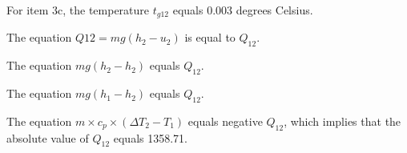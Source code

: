 For item 3c, the temperature \( t_{g12} \) equals 0.003 degrees Celsius.

The equation \( Q12 = mg(h_2 - u_2) \) is equal to \( Q_{12} \).

The equation \( mg(h_2 - h_2) \) equals \( Q_{12} \).

The equation \( mg(h_1 - h_2) \) equals \( Q_{12} \).

The equation \( m \times c_p \times (\Delta T_2 - T_1) \) equals negative \( Q_{12} \), which implies that the absolute value of \( Q_{12} \) equals 1358.71.